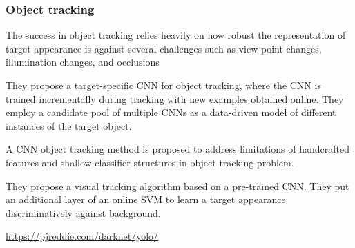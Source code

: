 \begin{frame}
	\frametitle{Object tracking}


	The success in object tracking relies heavily on how robust the representation of target appearance is against several challenges such as view point changes, illumination changes, and occlusions

	\bigskip



	They propose a target-specific CNN for object tracking, where the CNN is trained incrementally during tracking with new examples obtained online. They employ a candidate pool of multiple CNNs as a data-driven model of different instances of the target object.

	\medskip


	A CNN object tracking method is proposed to address limitations of handcrafted features and shallow classifier structures in object tracking problem.

	\medskip


	They propose a visual tracking algorithm based on a pre-trained CNN. They put an additional layer of an online SVM to learn a target appearance discriminatively against background.

	\bigskip

	\url{https://pjreddie.com/darknet/yolo/}
\end{frame}



